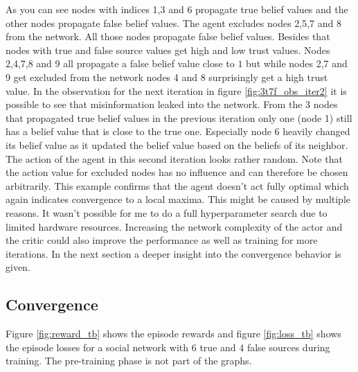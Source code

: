 \documentclass[11pt, a4paper]{article}
\begin{document}
As you can see nodes with indices 1,3 and 6 propagate true belief values and the other nodes propagate false belief values. The agent excludes nodes 2,5,7 and 8 from the network. All those nodes propagate false belief values. Besides that nodes with true and false source values get high and low trust values. Nodes 2,4,7,8 and 9 all propagate a false belief value close to $1$ but while nodes 2,7 and 9 get excluded from the network nodes 4 and 8 surprisingly get a high trust value. In the observation for the next iteration in figure \ref{fig:3t7f_obs_iter2} it is possible to see that misinformation leaked into the network. From the 3 nodes that propagated true belief values in the previous iteration only one (node 1) still has a belief value that is close to the true one. Especially node 6 heavily changed its belief value as it updated the belief value based on the beliefs of its neighbor. The action of the agent in this second iteration looks rather random. Note that the action value for excluded nodes has no influence and can therefore be chosen arbitrarily. \newline
This example confirms that the agent doesn't act fully optimal which again indicates convergence to a local maxima. This might be caused by multiple reasons. It wasn't possible for me to do a full hyperparameter search due to limited hardware resources. Increasing the network complexity of the actor and the critic could also improve the performance as well as training for more iterations. In the next section a deeper insight into the convergence behavior is given.

\subsection{Convergence}
Figure \ref{fig:reward_tb} shows the episode rewards and figure \ref{fig:loss_tb} shows the episode losses for a social network with 6 true and 4 false sources during training. The pre-training phase is not part of the graphs.
\end{document}
